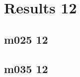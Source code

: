 \documentclass[pdftex,letterpaper,10pt]{article}
\begin{document}


\clearpage \section{Results 12}

\subsection{m025 12}



\clearpage \subsection{m035 12}


\end{document}
